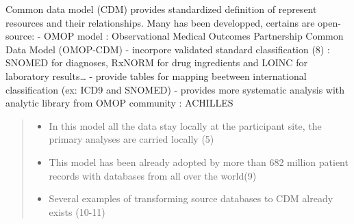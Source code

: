 Common data model (CDM) provides standardized definition of represent
resources and their relationships. Many has been developped, certains
are open-source: - OMOP model : Observational Medical Outcomes
Partnership Common Data Model (OMOP-CDM) - incorpore validated standard
classification (8) : SNOMED for diagnoses, RxNORM for drug ingredients
and LOINC for laboratory results\ldots{} - provide tables for mapping
beetween international classification (ex: ICD9 and SNOMED) - provides
more systematic analysis with analytic library from OMOP community :
ACHILLES

\begin{quote}
\begin{itemize}
\tightlist
\item
  In this model all the data stay locally at the participant site, the
  primary analyses are carried locally (5)
\item
  This model has been already adopted by more than 682 million patient
  records with databases from all over the world(9)
\item
  Several examples of transforming source databases to CDM already
  exists (10-11)
\end{itemize}
\end{quote}

